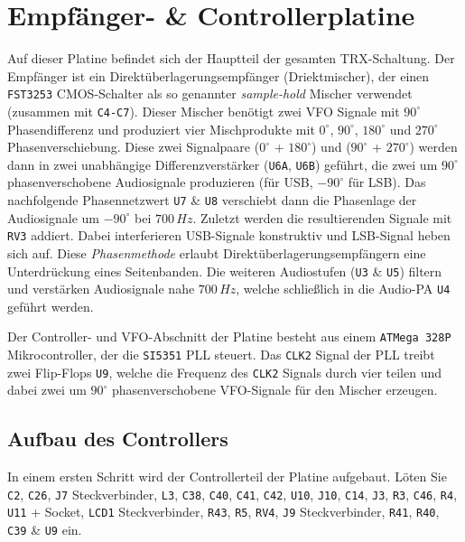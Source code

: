 \documentclass[10pt, a4paper,twoside]{scrartcl}
\begin{document}
\section{Empfänger- \& Controllerplatine} \label{sec:rx}
 Auf dieser Platine befindet sich der Hauptteil der gesamten TRX-Schaltung. Der Empfänger ist ein Direktüberlagerungsempfänger (Driektmischer), der einen \texttt{FST3253} CMOS-Schalter als so genannter \emph{sample-hold} Mischer verwendet (zusammen mit \texttt{C4-C7}). Dieser Mischer benötigt zwei VFO Signale mit $90^\circ$ Phasendifferenz und produziert vier Mischprodukte mit $0^\circ$, $90^\circ$, $180^\circ$ und $270^\circ$ Phasenverschiebung. Diese zwei Signalpaare ($0^\circ$ + $180^\circ$) und ($90^\circ$ + $270^\circ$) werden dann in zwei unabhängige Differenzverstärker (\texttt{U6A}, \texttt{U6B}) geführt, die zwei um $90^\circ$ phasenverschobene Audiosignale produzieren (für USB, $-90^\circ$ für LSB). Das nachfolgende Phasennetzwert \texttt{U7} \& \texttt{U8} verschiebt dann die Phasenlage der Audiosignale um $-90^\circ$ bei $700\,Hz$. Zuletzt werden die resultierenden Signale mit \texttt{RV3} addiert. Dabei interferieren USB-Signale konstruktiv und LSB-Signal heben sich auf. Diese \emph{Phasenmethode} erlaubt Direktüberlagerungsempfängern eine Unterdrückung eines Seitenbanden. Die weiteren Audiostufen (\texttt{U3} \& \texttt{U5}) filtern und verstärken Audiosignale nahe $700\,Hz$, welche schließlich in die Audio-PA \texttt{U4} geführt werden.
 
 Der Controller- und VFO-Abschnitt der Platine besteht aus einem \texttt{ATMega 328P} Mikrocontroller, der die \texttt{SI5351} PLL steuert. Das \texttt{CLK2} Signal der PLL treibt zwei Flip-Flops \texttt{U9}, welche die Frequenz des \texttt{CLK2} Signals durch vier teilen und dabei zwei um $90^\circ$ phasenverschobene VFO-Signale für den Mischer erzeugen.
  
\subsection{Aufbau des Controllers}
 In einem ersten Schritt wird der Controllerteil der Platine aufgebaut. Löten Sie \texttt{C2}, \texttt{C26}, \texttt{J7} Steckverbinder, \texttt{L3}, \texttt{C38}, \texttt{C40}, \texttt{C41}, \texttt{C42}, \texttt{U10}, \texttt{J10}, \texttt{C14}, \texttt{J3}, \texttt{R3}, \texttt{C46}, \texttt{R4}, \texttt{U11} + Socket, \texttt{LCD1} Steckverbinder, \texttt{R43}, \texttt{R5}, \texttt{RV4}, \texttt{J9} Steckverbinder, \texttt{R41}, \texttt{R40}, \texttt{C39} \& \texttt{U9} ein. 
\end{document}
